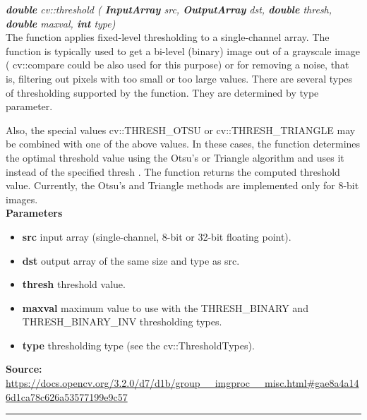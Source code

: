 \textit{\textbf{double} cv::threshold (
        \textbf{InputArray} src,
		\textbf{OutputArray}  	dst,
		\textbf{double}  	thresh,
		\textbf{double}  	maxval,
		\textbf{int}  	type)}\\

The function applies fixed-level thresholding to a single-channel array. The function is typically used to get a bi-level (binary) image out of a grayscale image ( cv::compare could be also used for this purpose) or for removing a noise, that is, filtering out pixels with too small or too large values. There are several types of thresholding supported by the function. They are determined by type parameter.

Also, the special values cv::THRESH\_OTSU or cv::THRESH\_TRIANGLE may be combined with one of the above values. In these cases, the function determines the optimal threshold value using the Otsu's or Triangle algorithm and uses it instead of the specified thresh . The function returns the computed threshold value. Currently, the Otsu's and Triangle methods are implemented only for 8-bit images.\\

\textbf{Parameters}
\begin{itemize}
    \item \textbf{src} input array (single-channel, 8-bit or 32-bit floating point).
    \item \textbf{dst} output array of the same size and type as src.
    \item \textbf{thresh} threshold value.
    \item \textbf{maxval} maximum value to use with the THRESH\_BINARY and THRESH\_BINARY\_INV thresholding types.
    \item \textbf{type}	thresholding type (see the cv::ThresholdTypes).
\end{itemize}

\begin{adjustbox}{width=1.2\textwidth,center=\textwidth}
\textbf{Source:} \url{https://docs.opencv.org/3.2.0/d7/d1b/group__imgproc__misc.html#gae8a4a146d1ca78c626a53577199e9c57}
\end{adjustbox}

\noindent\rule{\textwidth}{0.5pt}


